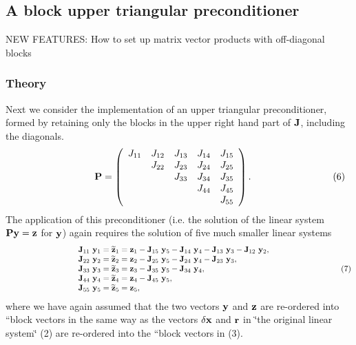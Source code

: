 \hypertarget{index_upper_triangular}{}\subsection{A block upper triangular preconditioner}\label{index_upper_triangular}
N\+EW F\+E\+A\+T\+U\+R\+ES\+: How to set up matrix vector products with off-\/diagonal blocks\hypertarget{index_upper_triangular_theory}{}\subsubsection{Theory}\label{index_upper_triangular_theory}
Next we consider the implementation of an upper triangular preconditioner, formed by retaining only the blocks in the upper right hand part of ${\bf J}$, including the diagonals. \[ \hspace{3cm} {\bf P} = \left( \begin{array}{ccccc} J_{11} & J_{12} & J_{13} & J_{14} & J_{15} \\ & J_{22} & J_{23} & J_{24} & J_{25} \\ & & J_{33} & J_{34} & J_{35} \\ & & & J_{44} & J_{45} \\ & & & & J_{55} \\ \end{array} \right). \hspace{3cm} (6) \] The application of this preconditioner (i.\+e. the solution of the linear system ${\bf P} {\bf y} ={\bf z}$ for ${\bf y}$) again requires the solution of five much smaller linear systems \[ \hspace{3cm} \begin{array}{l} {\bf J}_{11} \ {\bf y}_1 = \widetilde{\bf z}_1 = {\bf z}_1 - {\bf J}_{15} \ {\bf y}_5 - {\bf J}_{14} \ {\bf y}_4 - {\bf J}_{13} \ {\bf y}_3 - {\bf J}_{12} \ {\bf y}_2, \\ {\bf J}_{22} \ {\bf y}_2 = \widetilde{\bf z}_2 = {\bf z}_2 - {\bf J}_{25} \ {\bf y}_5 - {\bf J}_{24} \ {\bf y}_4 - {\bf J}_{23} \ {\bf y}_3, \\ {\bf J}_{33} \ {\bf y}_3 = \widetilde{\bf z}_3 ={\bf z}_3 - {\bf J}_{35} \ {\bf y}_5 - {\bf J}_{34} \ {\bf y}_4, \\ {\bf J}_{44} \ {\bf y}_4 = \widetilde{\bf z}_4 ={\bf z}_4 - {\bf J}_{45} \ {\bf y}_5, \\ {\bf J}_{55} \ {\bf y}_5 = \widetilde{\bf z}_5 = {\bf z}_5, \\ \end{array} \hspace{3cm} (7) \] where we have again assumed that the two vectors ${\bf y}$ and ${\bf z}$ are re-\/ordered into ``block vectors\textquotesingle{}\textquotesingle{} in the same way as the vectors $\delta {\bf x}$ and ${\bf r}$ in \char`\"{}the original linear system\char`\"{} (2) are re-\/ordered into the ``block vectors\textquotesingle{}\textquotesingle{} in (3).


